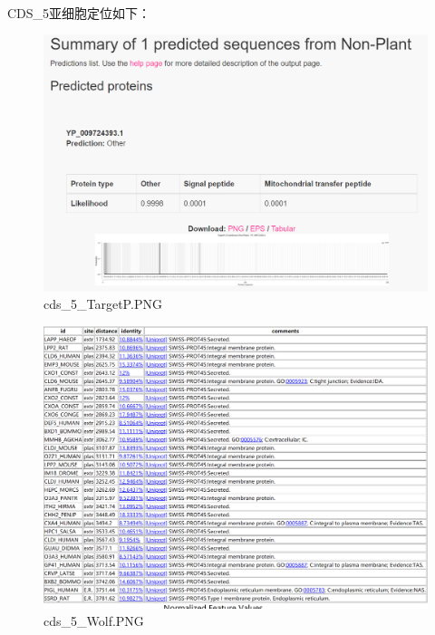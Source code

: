\documentclass[supercite]{HustGraduPaper}
\begin{document}
	\paragraph{}\label{subpara:subpara}CDS\_5亚细胞定位如下：
	\begin{figure}[H]
		\centering
		\includegraphics[width=1\textwidth]{./material/practice2/cds_5/TargetP.png}
		\caption{cds\_5\_TargetP.PNG}
	\end{figure}
	\begin{figure}[H]
		\centering
		\includegraphics[width=1\textwidth]{./material/practice2/cds_5/wolf.png}
		\caption{cds\_5\_Wolf.PNG}
	\end{figure}
\end{document}
